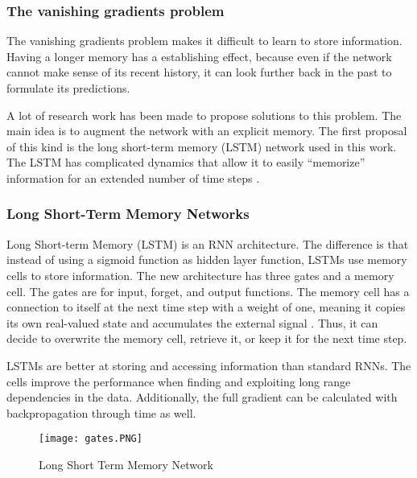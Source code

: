 \subsubsection*{The vanishing gradients problem}

The vanishing gradients problem makes it difficult to learn to store information. Having a longer memory has a establishing effect, because even if the network cannot make sense of its recent history, it can look further back in the past to formulate its predictions. \cite{graves2013generating}


A lot of research work has been made to propose solutions to this problem. The main idea is to augment the network with an explicit memory. The first proposal of this kind is the long short-term memory (LSTM) network used in this work. The LSTM has complicated dynamics that allow it to easily “memorize” information for an extended number of time steps \cite{zaremba2014recurrent}.

\subsubsection{Long Short-Term Memory Networks}
Long Short-term Memory (LSTM) is an RNN architecture. The difference is that instead of using a sigmoid function as hidden layer function, LSTMs use memory cells to store information. The new architecture has three gates and a memory cell. The gates are for input, forget, and output functions. The memory cell has a connection to itself at the next time step with a weight of one, meaning it copies its own real-valued state and accumulates the external signal \cite{lecun2015deep}. Thus, it can decide to overwrite the memory cell, retrieve it, or keep it for the next time step\cite{zaremba2014recurrent}. 

LSTMs are better at storing and accessing information than standard RNNs. The cells improve the performance when finding and exploiting long range dependencies in the data. Additionally, the full gradient can be calculated with backpropagation through time as well.\cite{graves2013generating}

\begin{figure}
\label{fig:lstm}
\center
\texttt{[image: gates.PNG]}
\caption{Long Short Term Memory Network}
\end{figure}

